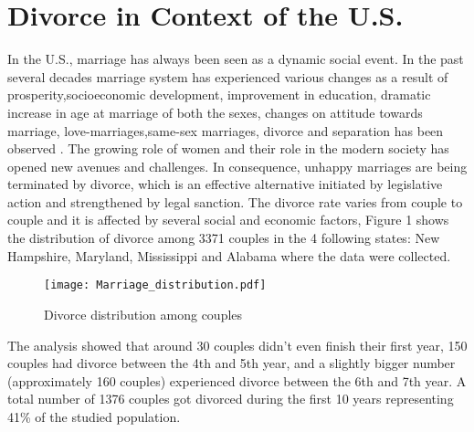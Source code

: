 \documentclass[10pt,twocolumn]{article}
\begin{document}
\section{Divorce in Context of the U.S.}
In the U.S., marriage has always been seen as a dynamic social event. In the past several decades marriage system has experienced various changes as a result of prosperity,socioeconomic development, improvement in education, dramatic increase in age at marriage of both the sexes, changes on attitude towards marriage, love-marriages,same-sex marriages, divorce and separation has been observed \cite{alba1986patterns}. The growing role of women and their role in the modern society has opened new avenues and challenges. In consequence, unhappy marriages are being terminated by divorce, which is an effective alternative initiated by legislative action and strengthened by legal sanction. The divorce rate varies from couple to couple and it is affected by several social and economic factors, Figure 1 shows the distribution of divorce among 3371 couples in the  4 following states: New Hampshire, Maryland, Mississippi and Alabama where the data were collected.
\begin{figure}[!htb]
\centering
\texttt{[image: Marriage\_distribution.pdf]}
\caption{Divorce distribution among couples}
\label{Fig:Divorce_Distribution}
\end{figure}
The analysis showed that around 30 couples didn't even finish their first year, 150 couples had divorce between the 4th and 5th year, and a slightly bigger number (approximately 160 couples) experienced divorce between the 6th and 7th year. A total number of 1376 couples got divorced during the first 10 years representing 41\% of the studied population.
\end{document}
